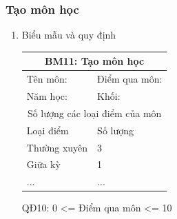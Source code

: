 \documentclass[a4paper]{article}
\begin{document}
						\subsubsection{Tạo môn học}	
						\begin{enumerate}
\item Biểu mẫu và quy định

\begin{table}[H]
\centering
\renewcommand{\arraystretch}{1.5}
\setlength{\tabcolsep}{12pt}
\begin{tabular}{|p{5cm}|p{5cm}|}
\hline
\multicolumn{2}{|c|}{\textbf{BM11: Tạo môn học}} \\  
\hline
Tên môn: \dotfill  & Điểm qua môn: \dotfill \\
\hline
Năm học: \dotfill & Khối: \dotfill \\
\hline
\multicolumn{2}{|c|}{Số lượng các loại điểm của môn} \\
\hline
Loại điểm & Số lượng \\
\hline
Thường xuyên & 3 \\
\hline
Giữa kỳ & 1 \\
\hline
... & ... \\
\hline
\end{tabular}
\end{table}

QĐ10: 0 <= Điểm qua môn <= 10


\end{enumerate}
\end{document}
